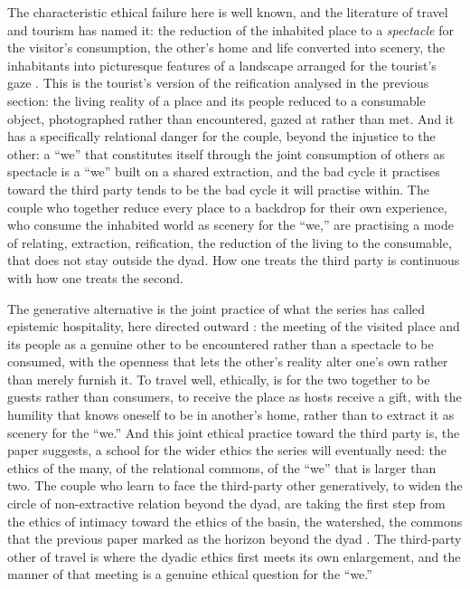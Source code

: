 The characteristic ethical failure here is well known, and the literature of travel and tourism has named it: the reduction of the inhabited place to a \emph{spectacle} for the visitor's consumption, the other's home and life converted into scenery, the inhabitants into picturesque features of a landscape arranged for the tourist's gaze \parencite{urry2011,maccannell1999}. This is the tourist's version of the reification analysed in the previous section: the living reality of a place and its people reduced to a consumable object, photographed rather than encountered, gazed at rather than met. And it has a specifically relational danger for the couple, beyond the injustice to the other: a ``we'' that constitutes itself through the joint consumption of others as spectacle is a ``we'' built on a shared extraction, and the bad cycle it practises toward the third party tends to be the bad cycle it will practise within. The couple who together reduce every place to a backdrop for their own experience, who consume the inhabited world as scenery for the ``we,'' are practising a mode of relating, extraction, reification, the reduction of the living to the consumable, that does not stay outside the dyad. How one treats the third party is continuous with how one treats the second.

The generative alternative is the joint practice of what the series has called epistemic hospitality, here directed outward \parencite{paperxiii}: the meeting of the visited place and its people as a genuine other to be encountered rather than a spectacle to be consumed, with the openness that lets the other's reality alter one's own rather than merely furnish it. To travel well, ethically, is for the two together to be guests rather than consumers, to receive the place as hosts receive a gift, with the humility that knows oneself to be in another's home, rather than to extract it as scenery for the ``we.'' And this joint ethical practice toward the third party is, the paper suggests, a school for the wider ethics the series will eventually need: the ethics of the many, of the relational commons, of the ``we'' that is larger than two. The couple who learn to face the third-party other generatively, to widen the circle of non-extractive relation beyond the dyad, are taking the first step from the ethics of intimacy toward the ethics of the basin, the watershed, the commons that the previous paper marked as the horizon beyond the dyad \parencite{paperxx,paperxv}. The third-party other of travel is where the dyadic ethics first meets its own enlargement, and the manner of that meeting is a genuine ethical question for the ``we.''

